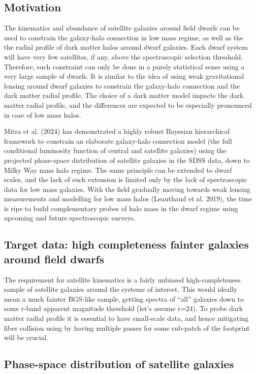 \subsection{Motivation}
The kinematics and abundance of satellite galaxies around field dwarfs can be used to constrain
the galaxy-halo connection in low mass regime, as well as the the radial profile of dark matter
halos around dwarf galaxies. Each dwarf system will have very few satellites, if any, above the spectroscopic
selection threshold. Therefore, such constraint can only be done in a purely statistical sense
using a very large sample of dwarfs. It is similar to the idea of using weak gravitational lensing
around dwarf galaxies to constrain the galaxy-halo connection and the dark matter radial profile.
The choice of a dark matter model impacts the dark matter radial profile, and the differences are
expected to be especially pronounced in case of low mass halos.

Mitra et al. (2024) has demonstrated a highly robust Bayesian hierarchical framework to constrain an elaborate
galaxy-halo connection model (the full conditional luminosity function of central and satellite galaxies)
using the projected phase-space distribution of satellite galaxies in the SDSS data, down to Milky Way mass halo
regime. The same principle can be extended to dwarf scales, and the lack of such extension is limited only
by the lack of spectroscopic data for low mass galaxies. With the field gradually moving towards weak lensing
measurements and modelling for low mass halos (Leauthaud et al. 2019), the time is ripe to build complementary
probes of halo mass in the dwarf regime using upcoming and future spectroscopic surveys.

  
\subsection{Target data: high completeness fainter galaxies around field dwarfs}
The requirement for satellite kinematics is a fairly unbiased high-completeness sample of satellite galaxies around
the systems of interest. This would ideally mean a much fainter BGS-like sample, getting spectra of ``all'' galaxies down to
some r-band apparent magnitude threshold (let's assume r=24). To probe dark matter radial profile it is essential to have
small-scale data, and hence mitigating fiber collision using by having multiple passes for some sub-patch of the footprint
will be crucial.


\subsection{Phase-space distribution of satellite galaxies}
